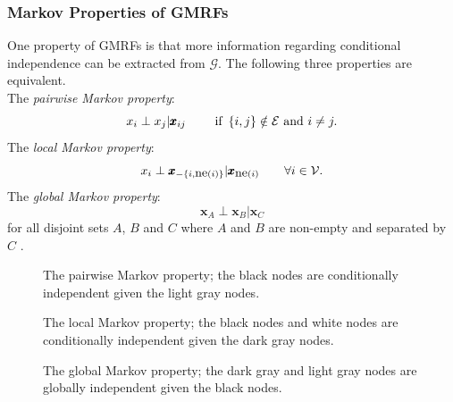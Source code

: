 \subsubsection{Markov Properties of GMRFs}
One property of GMRFs is that more information regarding conditional independence can be extracted from $\mathcal{G}$. The following three properties are equivalent. \\
The \textit{pairwise Markov property}:
\begin{equation*}
    x_i\perp x_j|\pmb{x}_{ij}\hspace{20pt}\hbox{ if }\left\lbrace i,j\right\rbrace\notin\mathcal{E}\hbox{ and }i\neq j.
\end{equation*}
The \textit{local Markov property}:
\begin{equation*}
    x_i\perp \pmb{x}_{-\left\lbrace i, \hbox{ne}\left(i\right)\right\rbrace}|\pmb{x}_{\hbox{ne}\left(i\right)}\hspace{20pt}\forall i\in\mathcal{V}.
\end{equation*}
The \textit{global Markov property}:
\begin{equation*}
    \pmb{x}_{A}\perp \pmb{x}_{B}|\pmb{x}_{C}
\end{equation*}
for all disjoint sets $A$, $B$ and $C$ where $A$ and $B$ are non-empty and separated by $C$ \autocite[][23--24]{rue2005gaussian}. 
\begin{figure}[H]
    \centering
    \caption{The pairwise Markov property; the black nodes are conditionally independent given the light gray nodes.}
    \label{fig:pairwise}
\end{figure}
\begin{figure}[H]
    \centering
    \caption{The local Markov property; the black nodes and white nodes are conditionally independent given the dark gray nodes.}
    \label{fig:local}
\end{figure}
\begin{figure}[H]
    \centering
    \caption{The global Markov property; the dark gray and light gray nodes are globally independent given the black nodes.}
    \label{fig:global}
\end{figure}
